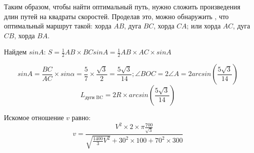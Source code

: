 Таким образом, чтобы найти оптимальный путь, нужно сложить произведения длин путей на квадраты скоростей.  
Проделав это, можно обнаружить , что оптимальный маршрут такой:  хорда $AB$, дуга $BC$, хорда $CA$;  или  хорда  
$AC$, дуга $CB$, хорда $BA$.

Найдем $sinA$:  $S=\frac{1}{2} AB \times BC sinA=\frac{1}{2} AB \times AC \times sinA$

$$sinA=\frac{BC}{AC} \times sin\alpha =\frac{5}{7} \times \frac{\sqrt{3}}{2}=\frac{5\sqrt{3}}{14}; \angle BOC=2\angle A=2arcsin\left(\frac{5\sqrt{3}}{14}\right)$$
$$L_{\text{дуги BC}}=2R \times arcsin\left(\frac{5\sqrt{3}}{14}\right) $$

Искомое  отношение $v$ равно:     
$$v=\frac{V^2 \times 2 \times \pi \frac{700}{\sqrt{3}}}{\sqrt{\frac{1400}{3} V^2}+30^2 \times 100+70^2 \times 300}$$


